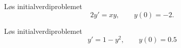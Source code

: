 \documentclass[a4paper,norsk,11pt]{interaktiv}
\begin{document}
%	







\begin{oppgave}{1}
  Løs initialverdiproblemet
  \begin{equation*}
    2y'=xy, \qquad y(0)=-2.
  \end{equation*}
\end{oppgave}

\begin{oppgave}{2}
    Løs initialverdiproblemet
    \begin{equation*}
      y' = 1-y^2, \qquad y(0)=0.5
    \end{equation*}
\end{oppgave}
\end{document}
